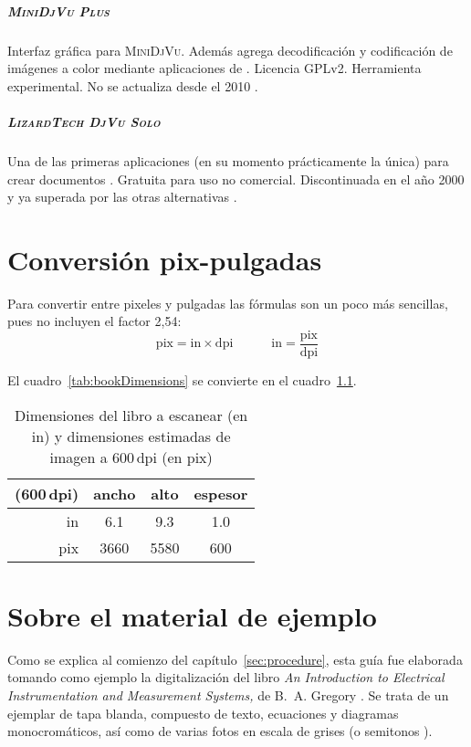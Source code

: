 \documentclass[%
	a5paper,
	10pt,
	twoside,
	openright,
	final,
]{memoir}
\begin{document}
{	\paragraph{\textsc{MiniDjVu Plus}} Interfaz gráfica para \textsc{MiniDjVu}. Además agrega decodificación y codificación de imágenes a color mediante aplicaciones de \djvulibre. Licencia GPLv2. Herramienta experimental. No se actualiza desde el 2010 \cite{MiniDjVuPlus}.
	\paragraph{\textsc{LizardTech DjVu Solo}} Una de las primeras aplicaciones (en su momento prácticamente la única) para crear documentos \djvu. Gratuita para uso no comercial. Discontinuada en el año 2000 y ya superada por las otras alternativas \cite{DjVuSolo}.

	\chapter{Conversión pix-pulgadas\label{app:conversion}} Para convertir entre pixeles y pulgadas las fórmulas son un poco más sencillas, pues no incluyen el factor \mbox{2,54}:
	\[
		\text{pix} = \text{in} \times \text{dpi}\hspace{3em} \text{in} = \frac{\text{pix}}{\text{dpi}}
	\]

	El cuadro~\ref{tab:bookDimensions} se convierte en el cuadro~\ref{tab:bookDimensionsInches}.
	\begin{table}
		\centering
		\begin{tabular}{rccc}
			\toprule
			(600\,dpi) & ancho & alto & espesor \\
			\midrule
			in  & 6.1 & 9.3 & 1.0 \\
			pix & 3660 & 5580 & 600 \\
			\bottomrule
		\end{tabular}
		\caption{Dimensiones del libro a escanear (en in) y dimensiones estimadas de imagen a 600\,dpi (en pix)\label{tab:bookDimensionsInches}}
	\end{table}

	\chapter{Sobre el material de ejemplo\label{sec:aboutGregory}} Como se explica al comienzo del capítulo~\ref{sec:procedure}, esta guía fue elaborada tomando como ejemplo la digitalización del libro \emph{An Introduction to Electrical Instrumentation and Measurement Systems,} de B.~A. Gregory \cite{GregorySpringer}. Se trata de un ejemplar de tapa blanda, compuesto de texto, ecuaciones y diagramas monocromáticos, así como de varias fotos en escala de grises (o semitonos \cite{WikipediaHalftone}).

}
\end{document}
